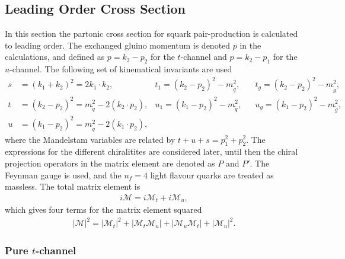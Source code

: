 \documentclass[twoside,english]{uiofysmaster}
\begin{document}
{\subsection{Leading Order Cross Section}\label{Sec:: susy hadron : Leading order cross section}

In this section the partonic cross section for squark pair-production is calculated to leading order. The exchanged gluino momentum is denoted $p$ in the calculations, and defined as $p= k_2-p_2 $ for the $t$-channel and $p=k_2-p_1$ for the $u$-channel. The following set of kinematical invariants are used
\begin{align*}
s &= (k_1 + k_2)^2 = 2 k_1 \cdot k_2, &t_1 = (k_2-p_2)^2 - m_{\widetilde{q}}^2, &&t_g = (k_2-p_2)^2 - m_{\widetilde{g}}^2,\\
t &= (k_2-p_2)^2 = m_{\widetilde{q}}^2 - 2 (k_2 \cdot p_2), &u_1 = (k_1-p_2)^2 - m_{\widetilde{q}}^2, &&u_g = (k_1-p_2)^2 - m_{\widetilde{g}}^2,\\
u &= (k_1 - p_2)^2 = m_{\widetilde{q}}^2 - 2 (k_1 \cdot p_2),
\end{align*}
where the Mandelstam variables are related by $t + u+ s = p_1^2 + p_2^2$. The expressions for the different chiralitites are considered later, until then the chiral projection operators in the matrix element are denoted as $P$ and $P'$. The Feynman gauge is used, and the $n_f = 4$ light flavour quarks are treated as massless. The total matrix element is
\begin{align}\label{Eq:: susy hadron : matrix element}
i\mathcal{M} = i\mathcal{M}_t + i\mathcal{M}_u,
\end{align}
which gives four terms for the matrix element squared
\begin{align}\label{Eq:: susy hadron : matrix element squared}
|\mathcal{M}|^2 = |\mathcal{M}_t|^2 + |\mathcal{M}_t \mathcal{M}_u| + |\mathcal{M}_u \mathcal{M}_t| + |\mathcal{M}_u|^2.
\end{align}

\subsubsection{Pure $t$-channel}

}
\end{document}
